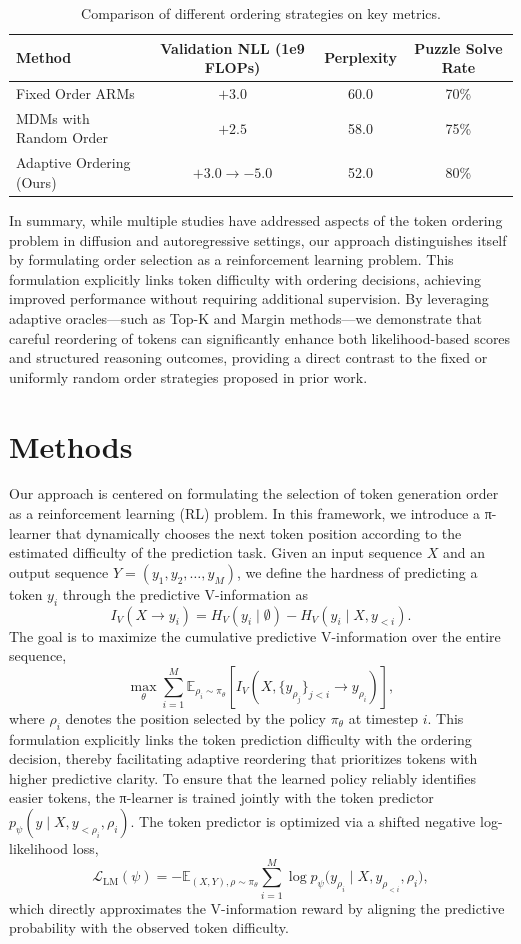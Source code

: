 \documentclass{article}
\begin{document}
\begin{table}[h]
\centering
\begin{tabular}{lccc}
\hline
Method & Validation NLL (1e9 FLOPs) & Perplexity & Puzzle Solve Rate \\
\hline
Fixed Order ARMs & $+3.0$ & 60.0 & 70\% \\
MDMs with Random Order & $+2.5$ & 58.0 & 75\% \\
Adaptive Ordering (Ours) & $+3.0 \rightarrow -5.0$ & 52.0 & 80\% \\
\hline
\end{tabular}
\caption{Comparison of different ordering strategies on key metrics.}
\label{tab:comparison}
\end{table}

In summary, while multiple studies have addressed aspects of the token ordering problem in diffusion and autoregressive settings, our approach distinguishes itself by formulating order selection as a reinforcement learning problem. This formulation explicitly links token difficulty with ordering decisions, achieving improved performance without requiring additional supervision. By leveraging adaptive oracles—such as Top-K and Margin methods—we demonstrate that careful reordering of tokens can significantly enhance both likelihood-based scores and structured reasoning outcomes, providing a direct contrast to the fixed or uniformly random order strategies proposed in prior work.

\section{Methods}
Our approach is centered on formulating the selection of token generation order as a reinforcement learning (RL) problem. In this framework, we introduce a π-learner that dynamically chooses the next token position according to the estimated difficulty of the prediction task. Given an input sequence \( X \) and an output sequence \( Y = (y_1, y_2, \dots, y_M) \), we define the hardness of predicting a token \( y_i \) through the predictive V-information as
\[
I_V(X \to y_i) = H_V(y_i \mid \emptyset) - H_V(y_i \mid X, y_{<i}).
\]
The goal is to maximize the cumulative predictive V-information over the entire sequence,
\[
\max_{\theta} \sum_{i=1}^{M} \mathbb{E}_{\rho_i \sim \pi_\theta}\left[ I_V\left(X, \{y_{\rho_j}\}_{j<i} \to y_{\rho_i}\right) \right],
\]
where \(\rho_i\) denotes the position selected by the policy \(\pi_\theta\) at timestep \(i\). This formulation explicitly links the token prediction difficulty with the ordering decision, thereby facilitating adaptive reordering that prioritizes tokens with higher predictive clarity. To ensure that the learned policy reliably identifies easier tokens, the π-learner is trained jointly with the token predictor \(p_\psi(y \mid X, y_{<\rho_i}, \rho_i)\). The token predictor is optimized via a shifted negative log-likelihood loss,
\[
\mathcal{L}_{\text{LM}}(\psi) = -\mathbb{E}_{(X,Y), \rho \sim \pi_\theta} \sum_{i=1}^{M} \log p_\psi\big(y_{\rho_i} \mid X, y_{\rho_{<i}}, \rho_i\big),
\]
which directly approximates the V-information reward by aligning the predictive probability with the observed token difficulty.
\end{document}
